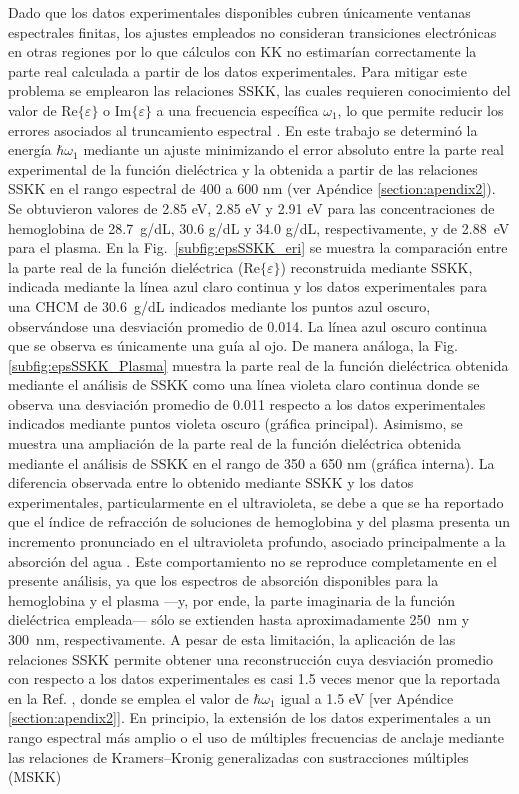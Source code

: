 Dado que los datos experimentales disponibles cubren únicamente ventanas espectrales finitas, los ajustes empleados no consideran transiciones electrónicas en otras regiones por lo que cálculos con KK no estimarían correctamente la parte real calculada a partir de los datos experimentales. Para mitigar este problema se emplearon las relaciones SSKK, las cuales requieren conocimiento del valor de $\text{Re}\{\varepsilon\}$ o $\text{Im}\{\varepsilon\}$ a una frecuencia específica $\omega_1$, lo que permite reducir los errores asociados al truncamiento espectral \cite{lucariniKramersKronigRelationsOptical2005}. En este trabajo se determinó la energía $\hbar\omega_1$ mediante un ajuste minimizando el error absoluto entre la parte real experimental de la función dieléctrica y la obtenida a partir de las relaciones SSKK en el rango espectral de 400 a 600 nm (ver Apéndice \ref{section:apendix2}). Se obtuvieron valores de 2.85 eV, 2.85 eV  y 2.91 eV para las concentraciones de hemoglobina de 28.7~g/dL, 30.6 g/dL y 34.0 g/dL, respectivamente, y de 2.88~eV para el plasma. En la Fig.~\ref{subfig:epsSSKK_eri} se muestra la comparación entre la parte real de la función dieléctrica ($\text{Re}\{\varepsilon\}$) reconstruida mediante SSKK, indicada mediante la línea azul claro continua y los datos experimentales para una CHCM de 30.6~g/dL indicados mediante los puntos azul oscuro, observándose una desviación promedio de 0.014. La línea azul oscuro continua que se observa es únicamente una guía al ojo. De manera análoga, la Fig. \ref{subfig:epsSSKK_Plasma} muestra la parte real de la función dieléctrica obtenida mediante el análisis de SSKK como una línea violeta claro continua donde se observa una desviación promedio de 0.011 respecto a los datos experimentales indicados mediante puntos violeta oscuro (gráfica principal). Asimismo, se muestra una ampliación de la parte real de la función dieléctrica obtenida mediante el análisis de SSKK en el rango de 350 a 650 nm (gráfica interna). La diferencia observada entre lo obtenido mediante SSKK y los datos experimentales, particularmente en el ultravioleta, se debe a que se ha reportado que el índice de refracción de soluciones de hemoglobina y del plasma presenta un incremento pronunciado en el ultravioleta profundo, asociado principalmente a la absorción del agua \cite{bosschaartLiteratureReviewNovel2014}.  Este comportamiento no se reproduce completamente en el presente análisis, ya que los espectros de absorción disponibles para la hemoglobina y el plasma ---y, por ende, la parte imaginaria de la función dieléctrica empleada--- sólo se extienden hasta aproximadamente 250~nm y 300~nm, respectivamente.  A pesar de esta limitación, la aplicación de las relaciones SSKK permite obtener una reconstrucción cuya desviación promedio con respecto a los datos experimentales es casi 1.5 veces menor que la reportada en la Ref. \cite{bosschaartLiteratureReviewNovel2014}, donde se emplea el valor de $\hbar\omega_1$ igual a 1.5 eV [ver Apéndice \ref{section:apendix2}]. En principio, la extensión de los datos experimentales a un rango espectral más amplio \cite{lucariniKramersKronigRelationsOptical2005} o el uso de múltiples frecuencias de anclaje mediante las relaciones de Kramers–Kronig generalizadas con sustracciones múltiples (MSKK) 